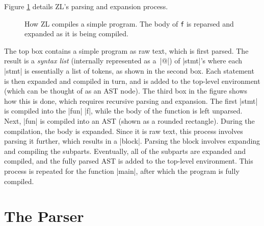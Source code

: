 Figure \ref{fig} details ZL's parsing and expansion process.  
\begin{figure}
\begin{center}
\UndefineShortVerb{\|}
\thefig
\DefineShortVerb{\|}
\end{center}
\caption[How ZL compiles a simple program.]%
  {How ZL compiles a simple program.  The body of \texttt{f} is
   reparsed and expanded as it is being compiled.}
\label{fig}
\end{figure}
The top box contains a simple program as raw text, which is first parsed.
The result is a \textit{syntax list} (internally represented as a~|@|)
of |stmt|'s where each |stmt| is essentially a list of tokens, as
shown in the second box.  Each statement is then expanded and compiled
in turn, and is added to the top-level environment (which can be
thought of as an AST node). The third box in the figure shows how this
is done, which requires recursive parsing and expansion.  The first
|stmt| is compiled into the |fun| |f|, while the body of the function
is left unparsed.  Next, |fun| is compiled into an AST (shown as a
rounded rectangle).  During the compilation, the body is expanded.
Since it is raw text, this process involves parsing it further, which
results in a |block|.  Parsing the block involves expanding and
compiling the subparts.  Eventually, all of the subparts are
expanded and compiled, and the fully parsed AST is added to the
top-level environment.  This process is repeated for the function
|main|, after which the program is fully compiled.
\section{The Parser}
\label{parser}

